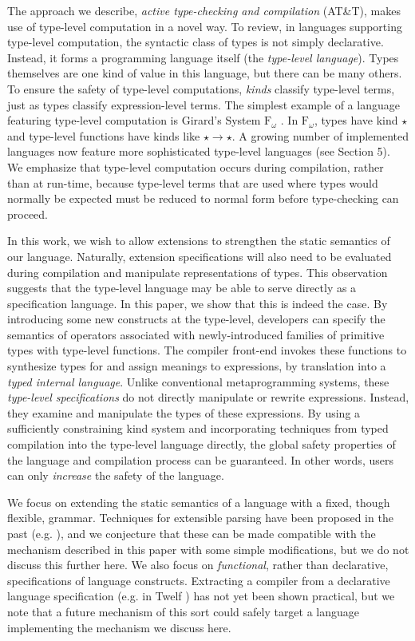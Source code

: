 \documentclass[9pt]{sigplanconf}
\begin{document}
The approach we describe, {\it active type-checking and compilation} (AT\&T), makes use of type-level computation in a novel way. To review, in languages supporting type-level computation, the syntactic class of types is not simply declarative. Instead, it forms a programming language itself (the {\it type-level language}). Types themselves are one kind of value in this language, but there can be many others. To ensure the safety of type-level computations, {\it kinds} classify type-level terms, just as types classify expression-level terms. The simplest example of a language featuring type-level computation is Girard's System $\text{F}_{\omega}$ \cite{tapl}. In $\text{F}_{\omega}$, types have kind $\star$ and type-level functions have kinds like $\star\rightarrow\star$. A growing number of implemented languages now feature more sophisticated type-level languages (see Section 5).  
We emphasize that type-level computation occurs during compilation, rather than at run-time, because type-level terms that are used where types would normally be expected must be reduced to normal form before type-checking can proceed. 

In this work, we wish to allow extensions to strengthen the static semantics of our language. Naturally, extension specifications will also need to be evaluated during compilation and manipulate representations of types. This observation suggests that the type-level language may be able to serve directly as a specification language. In this paper, we show that this is indeed the case. By introducing some new constructs at the type-level, developers can specify the semantics of operators associated with newly-introduced families of primitive types with type-level functions. The compiler front-end invokes these functions to synthesize types for and assign meanings to expressions, by translation into a {\it typed internal language}. Unlike conventional metaprogramming systems, these {\it type-level specifications} do not directly manipulate or rewrite expressions. Instead, they examine and manipulate the types of these expressions. 
By using a sufficiently constraining kind system and incorporating techniques from typed compilation into the type-level language directly, the global safety properties of the language and compilation process can be guaranteed. In other words, users can only {\it increase} the safety of the language.

We focus on extending the static semantics of a language with a fixed, though flexible, grammar. Techniques for extensible parsing have been proposed in the past (e.g. \cite{journals/entcs/BrabrandSV03}), and we conjecture that these can be made compatible with the mechanism described in this paper with some simple modifications, but we do not discuss this further here. We also focus on {\it functional}, rather than declarative, specifications of language constructs. Extracting a compiler from a declarative language specification (e.g. in Twelf \cite{twelf}) has not yet been shown practical, but we note that a future mechanism of this sort could safely target a language implementing the mechanism we discuss here.
\end{document}
